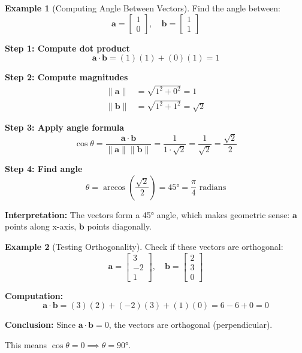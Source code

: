 \documentclass[12pt,a4paper]{article}
\theoremstyle{definition}
\newtheorem{example}{Example}[section]
\begin{document}
\begin{example}[Computing Angle Between Vectors]
Find the angle between:
\begin{equation}
\mathbf{a} = \begin{bmatrix} 1 \\ 0 \end{bmatrix}, \quad
\mathbf{b} = \begin{bmatrix} 1 \\ 1 \end{bmatrix}
\end{equation}

\textbf{Step 1: Compute dot product}
\begin{equation}
\mathbf{a} \cdot \mathbf{b} = (1)(1) + (0)(1) = 1
\end{equation}

\textbf{Step 2: Compute magnitudes}
\begin{align}
\|\mathbf{a}\| &= \sqrt{1^2 + 0^2} = 1 \\
\|\mathbf{b}\| &= \sqrt{1^2 + 1^2} = \sqrt{2}
\end{align}

\textbf{Step 3: Apply angle formula}
\begin{equation}
\cos \theta = \frac{\mathbf{a} \cdot \mathbf{b}}{\|\mathbf{a}\| \|\mathbf{b}\|} = \frac{1}{1 \cdot \sqrt{2}} = \frac{1}{\sqrt{2}} = \frac{\sqrt{2}}{2}
\end{equation}

\textbf{Step 4: Find angle}
\begin{equation}
\theta = \arccos\left(\frac{\sqrt{2}}{2}\right) = 45° = \frac{\pi}{4} \text{ radians}
\end{equation}

\textbf{Interpretation:} The vectors form a 45° angle, which makes geometric sense: $\mathbf{a}$ points along x-axis, $\mathbf{b}$ points diagonally.
\end{example}

\begin{example}[Testing Orthogonality]
Check if these vectors are orthogonal:
\begin{equation}
\mathbf{a} = \begin{bmatrix} 3 \\ -2 \\ 1 \end{bmatrix}, \quad
\mathbf{b} = \begin{bmatrix} 2 \\ 3 \\ 0 \end{bmatrix}
\end{equation}

\textbf{Computation:}
\begin{equation}
\mathbf{a} \cdot \mathbf{b} = (3)(2) + (-2)(3) + (1)(0) = 6 - 6 + 0 = 0
\end{equation}

\textbf{Conclusion:} Since $\mathbf{a} \cdot \mathbf{b} = 0$, the vectors are orthogonal (perpendicular).

This means $\cos \theta = 0 \implies \theta = 90°$.
\end{example}
\end{document}
